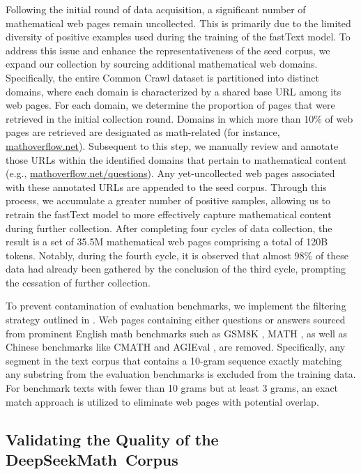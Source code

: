 Following the initial round of data acquisition, a significant number of mathematical web pages remain uncollected. This is primarily due to the limited diversity of positive examples used during the training of the fastText model. To address this issue and enhance the representativeness of the seed corpus, we expand our collection by sourcing additional mathematical web domains. Specifically, the entire Common Crawl dataset is partitioned into distinct domains, where each domain is characterized by a shared base URL among its web pages. For each domain, we determine the proportion of pages that were retrieved in the initial collection round. Domains in which more than 10\% of web pages are retrieved are designated as math-related (for instance, \url{mathoverflow.net}).
Subsequent to this step, we manually review and annotate those URLs within the identified domains that pertain to mathematical content (e.g., \url{mathoverflow.net/questions}). Any yet-uncollected web pages associated with these annotated URLs are appended to the seed corpus. Through this process, we accumulate a greater number of positive samples, allowing us to retrain the fastText model to more effectively capture mathematical content during further collection. After completing four cycles of data collection, the result is a set of 35.5M mathematical web pages comprising a total of 120B tokens. Notably, during the fourth cycle, it is observed that almost 98\% of these data had already been gathered by the conclusion of the third cycle, prompting the cessation of further collection.

To prevent contamination of evaluation benchmarks, we implement the filtering strategy outlined in \cite{deepseek-coder}. Web pages containing either questions or answers sourced from prominent English math benchmarks such as GSM8K \citep{gsm8k}, MATH \citep{MATH}, as well as Chinese benchmarks like CMATH \citep{wei2023cmath} and AGIEval \citep{agieval}, are removed. Specifically, any segment in the text corpus that contains a 10-gram sequence exactly matching any substring from the evaluation benchmarks is excluded from the training data. For benchmark texts with fewer than 10 grams but at least 3 grams, an exact match approach is utilized to eliminate web pages with potential overlap.

\subsection{Validating the Quality of the DeepSeekMath~Corpus}

